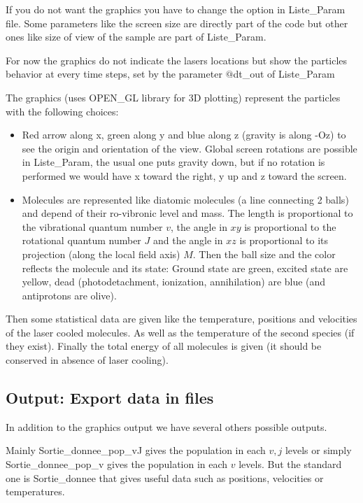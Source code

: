 \documentclass[amsmath,amssymb,nofootinbib]{revtex4-2}
\begin{document}
If you do not want the graphics you have to change the option in Liste\_Param file.
Some parameters like the screen size are directly part of the code but other ones like size of view of the sample are part of Liste\_Param.


For now the graphics do not indicate the lasers locations but show the particles behavior at every time steps, set by the parameter
$@${}dt\_out of Liste\_Param

The graphics (uses OPEN\_GL library for 3D plotting) represent the particles with the following choices:
\begin{itemize}
	\item Red arrow along x, green along y and blue along z (gravity is along -Oz) to see the origin and orientation of the view.  Global screen rotations are possible in Liste\_Param, the usual one puts gravity down, but if no rotation is performed we would have x toward the right, y up and z toward the screen.
	\item Molecules are represented like diatomic molecules (a line connecting 2 balls) 
and depend of their ro-vibronic level and mass.
	The length is proportional to the vibrational quantum number $v$, the angle in $x y$ is proportional to the rotational quantum number $J$ and the angle in $x z$ is proportional to its projection (along the local field axis) $M$. 
	Then the ball size and the color reflects the molecule and its state: Ground state are green, excited state are yellow, dead (photodetachment, ionization, annihilation)	are blue (and antiprotons are olive).
	
\end{itemize}



Then some statistical data are given like the temperature, positions and velocities of the laser cooled molecules.
As well as the temperature of the second species (if they exist). 
Finally the total energy of all molecules is given (it should be conserved in absence of laser cooling).


\subsection{Output: Export data in files}

In addition to the graphics output we have several others possible outputs.

Mainly Sortie\_donnee\_pop\_vJ gives the population in each $v,j$ levels or simply  Sortie\_donnee\_pop\_v gives the population in each $v$ levels. But the standard one is
Sortie\_donnee that gives useful data such as positions, velocities or temperatures.
\end{document}
